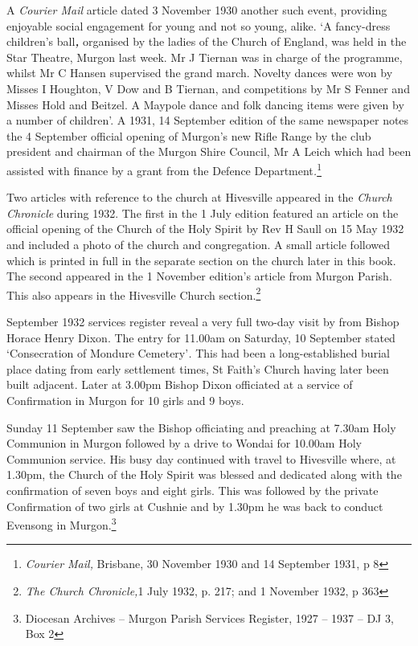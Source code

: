 A \emph{Courier Mail} article dated 3 November 1930 another such event,
providing enjoyable social engagement for young and not so young, alike.
`A fancy-dress children's ball\emph{\textbf{,}} organised by the ladies
of the Church of England, was held in the Star Theatre, Murgon last
week. Mr J Tiernan was in charge of the programme, whilst Mr C Hansen
supervised the grand march. Novelty dances were won by Misses I
Houghton, V Dow and B Tiernan, and competitions by Mr S Fenner and
Misses Hold and Beitzel. A Maypole dance and folk dancing items were
given by a number of children'. A 1931, 14 September edition of the same
newspaper notes the 4 September official opening of Murgon's new Rifle
Range by the club president and chairman of the Murgon Shire Council, Mr
A Leich which had been assisted with finance by a grant from the Defence
Department\emph{.}\footnote{\emph{Courier Mail,} Brisbane, 30 November
  1930 and 14 September 1931, p 8}

Two articles with reference to the church at Hivesville appeared in the
\emph{Church Chronicle} during 1932. The first in the 1 July edition
featured an article on the official opening of the Church of the Holy
Spirit by Rev H Saull on 15 May 1932 and included a photo of the church
and congregation. A small article followed which is printed in full in
the separate section on the church later in this book. The second
appeared in the 1 November edition's article from Murgon Parish. This
also appears in the Hivesville Church section.\footnote{\emph{The Church
  Chronicle,}1 July 1932, p. 217; and 1 November 1932, p 363}

September 1932 services register reveal a very full two-day visit by
from Bishop Horace Henry Dixon. The entry for 11.00am on Saturday, 10
September stated `Consecration of Mondure Cemetery'\emph{.} This had
been a long-established burial place dating from early settlement times,
St Faith's Church having later been built adjacent. Later at 3.00pm
Bishop Dixon officiated at a service of Confirmation in Murgon for 10
girls and 9 boys.

Sunday 11 September saw the Bishop officiating and preaching at 7.30am
Holy Communion in Murgon followed by a drive to Wondai for 10.00am Holy
Communion service. His busy day continued with travel to Hivesville
where, at 1.30pm, the Church of the Holy Spirit was blessed and
dedicated along with the confirmation of seven boys and eight girls.
This was followed by the private Confirmation of two girls at Cushnie
and by 1.30pm he was back to conduct Evensong in Murgon.\footnote{Diocesan
  Archives -- Murgon Parish Services Register, 1927 -- 1937 -- DJ 3, Box
  2}

